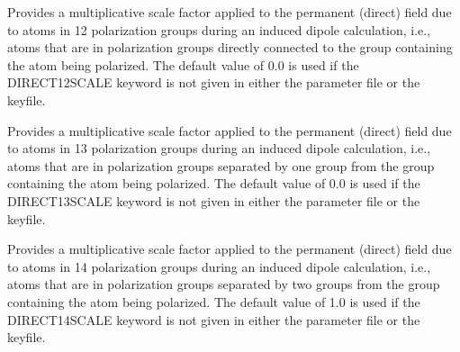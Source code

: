 \documentclass[letterpaper,11pt,english]{sphinxmanual}
\begin{document}
\ignorespaces {}\label{\detokenize{text/keywords:key-direct-12-scale}}\begin{description}
\sphinxAtStartPar
Provides a multiplicative scale factor applied to the permanent (direct) field due to atoms in 1\sphinxhyphen{}2 polarization groups during an induced dipole calculation, i.e., atoms that are in polarization groups directly connected to the group containing the atom being polarized. The default value of 0.0 is used if the DIRECT\sphinxhyphen{}12\sphinxhyphen{}SCALE keyword is not given in either the parameter file or the keyfile.

\end{description}

\ignorespaces {}\label{\detokenize{text/keywords:key-direct-13-scale}}\begin{description}
\sphinxAtStartPar
Provides a multiplicative scale factor applied to the permanent (direct) field due to atoms in 1\sphinxhyphen{}3 polarization groups during an induced dipole calculation, i.e., atoms that are in polarization groups separated by one group from the group containing the atom being polarized. The default value of 0.0 is used if the DIRECT\sphinxhyphen{}13\sphinxhyphen{}SCALE keyword is not given in either the parameter file or the keyfile.

\end{description}

\ignorespaces {}\label{\detokenize{text/keywords:key-direct-14-scale}}\begin{description}
\sphinxAtStartPar
Provides a multiplicative scale factor applied to the permanent (direct) field due to atoms in 1\sphinxhyphen{}4 polarization groups during an induced dipole calculation, i.e., atoms that are in polarization groups separated by two groups from the group containing the atom being polarized. The default value of 1.0 is used if the DIRECT\sphinxhyphen{}14\sphinxhyphen{}SCALE keyword is not given in either the parameter file or the keyfile.

\end{description}
\end{document}
